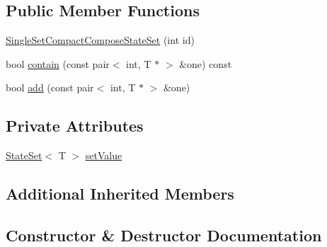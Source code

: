 \subsection*{Public Member Functions}
\begin{DoxyCompactItemize}
\item 
\mbox{\hyperlink{classgraphsat_1_1_single_set_compact_compose_state_set_aa15e6c6f51cb47983672fc67178ece44}{Single\+Set\+Compact\+Compose\+State\+Set}} (int id)
\item 
bool \mbox{\hyperlink{classgraphsat_1_1_single_set_compact_compose_state_set_a0ef077413f338e00cd1420a0edc439fa}{contain}} (const pair$<$ int, T $\ast$ $>$ \&one) const
\item 
bool \mbox{\hyperlink{classgraphsat_1_1_single_set_compact_compose_state_set_a51dc5d12b4a54e6b8d724d0496367b7f}{add}} (const pair$<$ int, T $\ast$ $>$ \&one)
\end{DoxyCompactItemize}
\subsection*{Private Attributes}
\begin{DoxyCompactItemize}
\item 
\mbox{\hyperlink{classgraphsat_1_1_state_set}{State\+Set}}$<$ T $>$ \mbox{\hyperlink{classgraphsat_1_1_single_set_compact_compose_state_set_adf90edd590751b9f26c7a267cf3ec0a0}{set\+Value}}
\end{DoxyCompactItemize}
\subsection*{Additional Inherited Members}


\subsection{Constructor \& Destructor Documentation}
\mbox{\label{classgraphsat_1_1_single_set_compact_compose_state_set_aa15e6c6f51cb47983672fc67178ece44}} 
